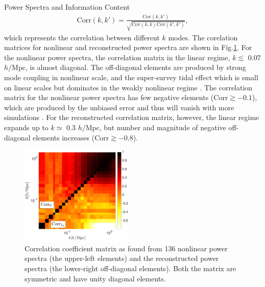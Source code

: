 \begin{section}{Power Spectra and Information Content}
\begin{align}
    \mathrm{Corr}\left(k,k'\right)=\frac{\mathrm{Cov}\left(k,k'\right)}
    {\sqrt{\mathrm{Cov}\left(k,k\right)\mathrm{Cov}\left(k',k'\right)}},
\end{align}
which represents the correlation between different $k$ modes. 
The corelation matrices for nonlinear and reconstructed power spectra 
are shown in Fig.\ref{fig:corrall}. For the nonlinear power spectra, the
correlation matrix in the linear regime, $k \lesssim$ 0.07 $h/\mathrm{Mpc}$, 
is almost diagonal. 
The off-diagonal elements are produced by strong mode coupling in nonlinear 
scale, and the super-survey tidal effect which is small on linear scales but 
dominates in the weakly nonlinear regime \cite{bib:Kazuyuki2016}.
The correlation matrix for the nonlinear power spectra has few negative elements
($\mathrm{Corr} \gtrsim -0.1$), which are produced by the unbiased error and 
thus  will vanish with more simulations \cite{bib:Takahashi2009}.
For the reconstructed correlation matrix, however, the linear regime expands 
up to $k \simeq$ 0.3 $h/\mathrm{Mpc}$, but number and magnitude of negative 
off-diagonal elements increases ($\mathrm{Corr} \gtrsim -0.8$). 

\begin{figure}
 \centering
  \includegraphics[width=0.48\textwidth]{fig3.pdf}
  \caption{Correlation coefficient matrix as found from 136 nonlinear power 
spectra (the upper-left elements) and the reconstructed power spectra (the 
lower-right off-diagonal elements). Both the matrix are symmetric and have 
unity diagonal elements.}
    \label{fig:corrall}
\end{figure}


\end{section}
